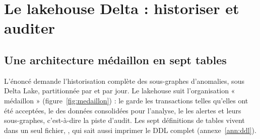 \chapter{Le lakehouse Delta : historiser et auditer}
\label{ch:lakehouse}

\section{Une architecture médaillon en sept tables}
L'énoncé demande l'historisation complète des sous-graphes d'anomalies, sous
Delta Lake, partitionnée par  et par jour. Le lakehouse
suit l'organisation « médaillon » (figure~\ref{fig:medaillon}) : le
 garde les transactions telles qu'elles ont été acceptées, le
 des données consolidées pour l'analyse, le  les
alertes et leurs sous-graphes, c'est-à-dire la piste d'audit. Les sept
définitions de tables vivent dans un seul fichier,
, qui sait aussi imprimer le DDL
complet (annexe~\ref{ann:ddl}).

